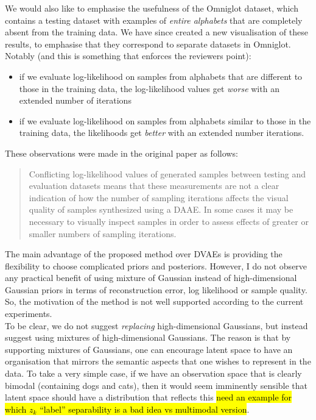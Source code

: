 \documentclass{article}
\begin{document}
We would also like to emphasise the usefulness of the Omniglot dataset, which contains a testing dataset with examples of {\em entire alphabets} that are completely absent from the training data. We have since created a new visualisation of these results, to emphasise that they correspond to separate datasets in Omniglot. Notably (and this is something that enforces the reviewers point):

\begin{itemize}
    \item if we evaluate log-likelihood on samples from alphabets that are different to those in the training data, the log-likelihood values get {\em worse} with an extended number of iterations
    \item if we evaluate log-likelihood on samples from alphabets similar to those in the training data, the likelihoods get {\em better} with an extended number iterations.
\end{itemize}

{\color{red} 
These observations were made in the original paper as follows:
 \begin{quote}
 Conflicting log-likelihood values of generated samples between testing and evaluation datasets means that these measurements are not a clear indication of how the number of sampling iterations affects the visual quality of samples synthesized using a DAAE. In some cases it may be necessary to visually inspect samples in order to assess effects of greater or smaller numbers of sampling iterations. 
 \end{quote}
}

{\color{blue}
The main advantage of the proposed method over DVAEs is providing the flexibility to choose complicated priors and posteriors. However, I do not observe any practical benefit of using mixture of Gaussian instead of high-dimensional Gaussian priors in terms of reconstruction error, log likelihood or sample quality. So, the motivation of the method is not well supported according to the current experiments.}\\


To be clear, we do not suggest {\em replacing} high-dimensional Gaussians, but instead suggest using mixtures of high-dimensional Gaussians.  The reason is that by supporting mixtures of Gaussians, one can encourage latent space to have an organisation that mirrors the semantic aspects that one wishes to represent in the data.  To take a very simple case, if we have an observation space that is clearly bimodal (containing dogs and cats), then it would seem imminently sensible that latent space should have a distribution that reflects this \hl{need an example for which $z_k$ ``label'' separability is a bad idea vs multimodal version}.\\
\end{document}
